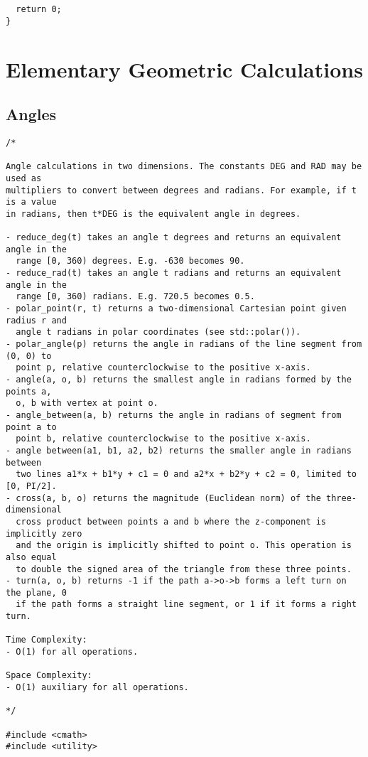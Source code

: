 \begin{lstlisting}
  return 0;
}
\end{lstlisting}

\section{Elementary Geometric Calculations}
\setcounter{section}{2}
\setcounter{subsection}{0}
\subsection{Angles}
\begin{lstlisting}
/*

Angle calculations in two dimensions. The constants DEG and RAD may be used as
multipliers to convert between degrees and radians. For example, if t is a value
in radians, then t*DEG is the equivalent angle in degrees.

- reduce_deg(t) takes an angle t degrees and returns an equivalent angle in the
  range [0, 360) degrees. E.g. -630 becomes 90.
- reduce_rad(t) takes an angle t radians and returns an equivalent angle in the
  range [0, 360) radians. E.g. 720.5 becomes 0.5.
- polar_point(r, t) returns a two-dimensional Cartesian point given radius r and
  angle t radians in polar coordinates (see std::polar()).
- polar_angle(p) returns the angle in radians of the line segment from (0, 0) to
  point p, relative counterclockwise to the positive x-axis.
- angle(a, o, b) returns the smallest angle in radians formed by the points a,
  o, b with vertex at point o.
- angle_between(a, b) returns the angle in radians of segment from point a to
  point b, relative counterclockwise to the positive x-axis.
- angle between(a1, b1, a2, b2) returns the smaller angle in radians between
  two lines a1*x + b1*y + c1 = 0 and a2*x + b2*y + c2 = 0, limited to [0, PI/2].
- cross(a, b, o) returns the magnitude (Euclidean norm) of the three-dimensional
  cross product between points a and b where the z-component is implicitly zero
  and the origin is implicitly shifted to point o. This operation is also equal
  to double the signed area of the triangle from these three points.
- turn(a, o, b) returns -1 if the path a->o->b forms a left turn on the plane, 0
  if the path forms a straight line segment, or 1 if it forms a right turn.

Time Complexity:
- O(1) for all operations.

Space Complexity:
- O(1) auxiliary for all operations.

*/

#include <cmath>
#include <utility>


\end{lstlisting}
